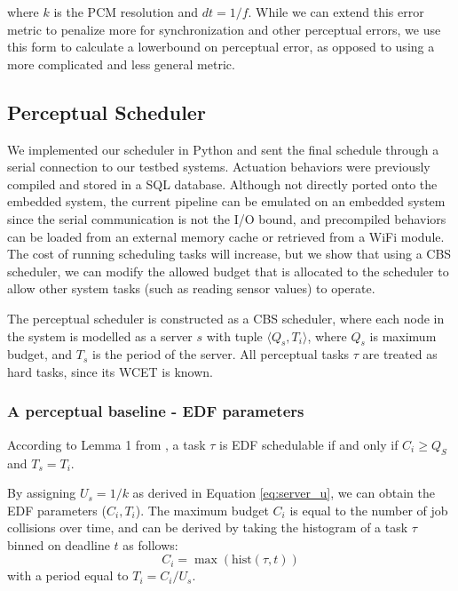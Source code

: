 \documentclass{sigchi}
\begin{document}
  where $k$ is the PCM resolution and $dt = 1/f$. While we can extend this error metric to penalize more for synchronization and other perceptual errors, we use this form to calculate a lowerbound on perceptual error, as opposed to using a more complicated and less general metric. 



  \subsection{Perceptual Scheduler}
  We implemented our scheduler in Python and sent the final schedule through a serial connection to our testbed systems. Actuation behaviors were previously compiled and stored in a SQL database. Although not directly ported onto the embedded system, the current pipeline can be emulated on an embedded system since the serial communication is not the I/O bound, and precompiled behaviors can be loaded from an external memory cache or retrieved from a WiFi module. The cost of running scheduling tasks will increase, but we show that using a CBS scheduler, we can modify the allowed budget that is allocated to the scheduler to allow other system tasks (such as reading sensor values) to operate. 

  The perceptual scheduler is constructed as a CBS scheduler, where each node in the system is modelled as a server $s$ with tuple $\langle Q_s, T_i \rangle$, where $Q_s$ is maximum budget, and $T_s$ is the period of the server. 
  All perceptual tasks $\tau$ are treated as hard tasks, since its WCET is known. 

  \subsubsection{A perceptual baseline - EDF parameters}
  According to Lemma 1 from \cite{abeni_integrating_1998}, a task $\tau$ is EDF schedulable if and only if $C_i \geq Q_S$ and $T_s = T_i$. 

  By assigning $U_s = 1/k$ as derived in Equation \ref{eq:server_u}, we can obtain the EDF parameters ($C_i, T_i$). The maximum budget $C_i$ is equal to the number of job collisions over time, and can be derived by taking the histogram of a task $\tau$ binned on deadline $t$ as follows:
  \begin{equation} 
    C_i = \max(\text{hist}(\tau, t))
    \label{eq:collisions}
  \end{equation}
  with a period equal to $T_i = C_i / U_s$. 
\end{document}
